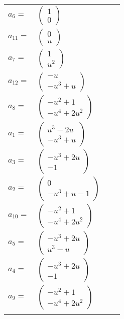 \documentclass[1p]{elsarticle_modified}
\theoremstyle{definition}
\begin{document}
\begin{tabular}{m{7pt} m{180pt} m{7pt} m{180pt} }
\flushright $a_{6}=$&$\begin{pmatrix}1\\0\end{pmatrix}$ \\
\flushright $a_{11}=$&$\begin{pmatrix}0\\u\end{pmatrix}$ \\
\flushright $a_{7}=$&$\begin{pmatrix}1\\u^2\end{pmatrix}$ \\
\flushright $a_{12}=$&$\begin{pmatrix}- u\\- u^3+u\end{pmatrix}$ \\
\flushright $a_{8}=$&$\begin{pmatrix}- u^2+1\\- u^4+2 u^2\end{pmatrix}$ \\
\flushright $a_{1}=$&$\begin{pmatrix}u^3-2 u\\- u^3+u\end{pmatrix}$ \\
\flushright $a_{3}=$&$\begin{pmatrix}- u^3+2 u\\-1\end{pmatrix}$ \\
\flushright $a_{2}=$&$\begin{pmatrix}0\\- u^3+u-1\end{pmatrix}$ \\
\flushright $a_{10}=$&$\begin{pmatrix}- u^2+1\\- u^4+2 u^2\end{pmatrix}$ \\
\flushright $a_{5}=$&$\begin{pmatrix}- u^3+2 u\\u^3- u\end{pmatrix}$ \\
\flushright $a_{4}=$&$\begin{pmatrix}- u^3+2 u\\-1\end{pmatrix}$ \\
\flushright $a_{9}=$&$\begin{pmatrix}- u^2+1\\- u^4+2 u^2\end{pmatrix}$\\&\end{tabular}
\end{document}
